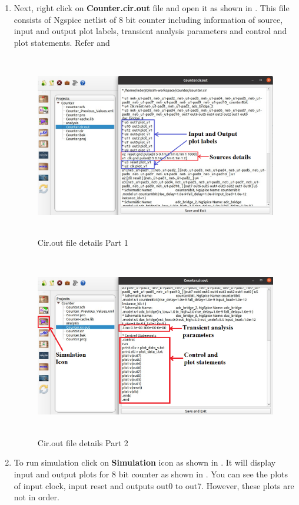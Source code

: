 \begin{enumerate}
\item Next, right click on \textbf{Counter.cir.out} file and open it as shown in . This file consists of Ngspice netlist of 8 bit counter including information of source, input and output plot labels, transient analysis parameters and control and plot statements. Refer  and 

\begin{figure}[H]
\centering
\includegraphics[width = 14cm, height =8cm]{./NgVeri/cirout1.png}
\caption{Cir.out file details Part 1}
\label{cirout1}
\end{figure}

\begin{figure}[H]
\centering
\includegraphics[width = 14cm, height =8cm]{./NgVeri/cirout2.png}
\caption{Cir.out file details Part 2}
\label{cirout2}
\end{figure}

\item To run simulation click on \textbf{Simulation} icon as shown in . It will display input and output plots for 8 bit counter as shown in . You can see the plots of input clock, input reset and outputs out0 to out7. However, these plots are not in order. 


\end{enumerate}
